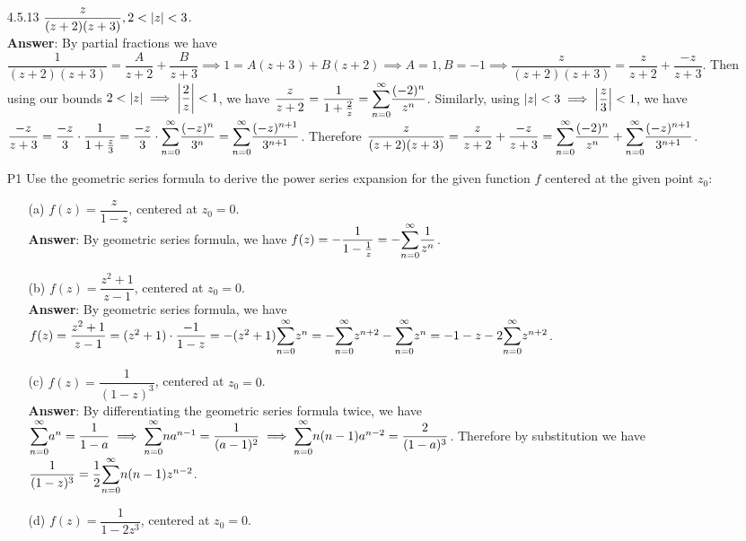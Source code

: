 \documentclass{article}
\begin{document}
\begin{itemize}
      \item [4.5.13] $\dfrac{z}{(z+2)(z+3)},2<\abs{z}<3$.\\
            \textbf{Answer}: By partial fractions we have $\dfrac{1}{(z+2)(z+3)}=\dfrac{A}{z+2}+\dfrac{B}{z+3}\implies 1=A(z+3)+B(z+2)\implies A=1,B=-1\implies\dfrac{z}{(z+2)(z+3)}=\dfrac{z}{z+2}+\dfrac{-z}{z+3}$. Then using our bounds $2<\abs{z}\implies\abs{\dfrac{2}{z}}<1$, we have $\dfrac{z}{z+2}=\dfrac{1}{1+\frac{2}{z}}=\mathlarger{\sum_{n=0}^\infty}\dfrac{(-2)^n}{z^n}$. Similarly, using $\abs{z}<3\implies\abs{\dfrac{z}{3}}<1$, we have $\dfrac{-z}{z+3}=\dfrac{-z}{3}\cdot\dfrac{1}{1+\frac{z}{3}}=\dfrac{-z}{3}\cdot\mathlarger{\sum_{n=0}^\infty}\dfrac{(-z)^n}{3^n}=\mathlarger{\sum_{n=0}^\infty}\dfrac{(-z)^{n+1}}{3^{n+1}}$. Therefore $\dfrac{z}{(z+2)(z+3)}=\dfrac{z}{z+2}+\dfrac{-z}{z+3}=\mathlarger{\sum_{n=0}^\infty}\dfrac{(-2)^n}{z^n}+\mathlarger{\sum_{n=0}^\infty}\dfrac{(-z)^{n+1}}{3^{n+1}}$.
      \item [P1] Use the geometric series formula to derive the power series expansion for the given function $f$ centered at the given point $z_0$:
            \begin{itemize}
                  \item [(a)] $f(z)=\dfrac{z}{1-z}$, centered at $z_0=0$.\\
                        \textbf{Answer}: By geometric series formula, we have $f(z)=-\dfrac{1}{1-\frac{1}{z}}=-\mathlarger{\sum_{n=0}^\infty}\dfrac{1}{z^n}$.
                  \item [(b)] $f(z)=\dfrac{z^2+1}{z-1}$, centered at $z_0=0$.\\
                        \textbf{Answer}: By geometric series formula, we have $f(z)=\dfrac{z^2+1}{z-1}=(z^2+1)\cdot\dfrac{-1}{1-z}=-(z^2+1)\mathlarger{\sum_{n=0}^\infty}z^n=-\mathlarger{\sum_{n=0}^\infty}z^{n+2}-\mathlarger{\sum_{n=0}^\infty}z^n=-1-z-2\mathlarger{\sum_{n=0}^\infty}z^{n+2}$.
                  \item [(c)] $f(z)=\dfrac{1}{(1-z)^3}$, centered at $z_0=0$.\\
                        \textbf{Answer}: By differentiating the geometric series formula twice, we have $\mathlarger{\sum_{n=0}^\infty}a^n=\dfrac{1}{1-a}\implies\mathlarger{\sum_{n=0}^\infty}na^{n-1}=\dfrac{1}{(a-1)^2}\implies\mathlarger{\sum_{n=0}^\infty}n(n-1)a^{n-2}=\dfrac{2}{(1-a)^3}$. Therefore by substitution we have $\dfrac{1}{(1-z)^3}=\dfrac{1}{2}\mathlarger{\sum_{n=0}^\infty}n(n-1)z^{n-2}$.
                  \item [(d)] $f(z)=\dfrac{1}{1-2z^3}$, centered at $z_0=0$.\\

\end{itemize}
\end{itemize}
\end{document}
